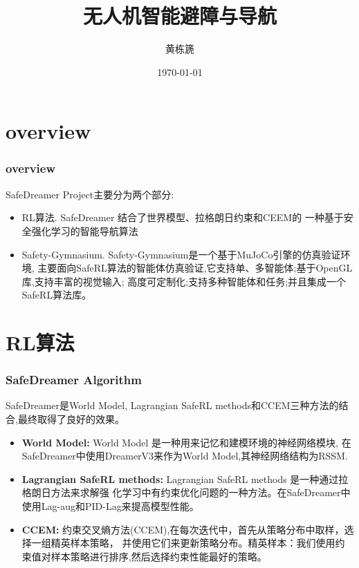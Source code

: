 \documentclass[10pt,mathserif]{beamer}%
\title{无人机智能避障与导航}
\institute[北京航空航天大学\\计算机学院]{北京航空航天大学计算机学院23级硕士研究
生} %
\author{黄栋篪}
\date{\today}%
\begin{document}
{\xdbg {}}%

\section{overview}

\begin{frame}[t, fragile]
	\frametitle{overview}
	\begin{spacing}{1.5}
		SafeDreamer Project主要分为两个部分:
		\begin{itemize}
			\item RL算法. SafeDreamer 结合了世界模型、拉格朗日约束和CEEM的
			一种基于安全强化学习的智能导航算法
			\item Safety-Gymnasium. Safety-Gymnasium是一个基于MuJoCo引擎的仿真验证环境,
			主要面向SafeRL算法的智能体仿真验证,它支持单、多智能体;基于OpenGL库,支持丰富的视觉输入;
			高度可定制化;支持多种智能体和任务;并且集成一个SafeRL算法库。
		\end{itemize}
	\end{spacing}
\end{frame}

\section{RL算法}
\begin{frame}[t, fragile]
	\frametitle{SafeDreamer Algorithm}
	\begin{spacing}{1.3}
		SafeDreamer是World Model, Lagrangian SafeRL methods和CCEM三种方法的结合,最终取得了良好的效果。
		\begin{itemize}
			\item \textbf{World Model:} World Model 是一种用来记忆和建模环境的神经网络模块,
			在SafeDreamer中使用DreamerV3来作为World Model,其神经网络结构为RSSM.
			\item \textbf{Lagrangian SafeRL methods:} Lagrangian SafeRL methods 是一种通过拉格朗日方法来求解强
			化学习中有约束优化问题的一种方法。在SafeDreamer中使用Lag-aug和PID-Lag来提高模型性能。
			\item \textbf{CCEM:} 约束交叉熵方法(CCEM),在每次迭代中，首先从策略分布中取样，选择一组精英样本策略，
			并使用它们来更新策略分布。精英样本：我们使用约束值对样本策略进行排序,然后选择约束性能最好的策略。
		\end{itemize}
	\end{spacing}
\end{frame}
\end{document}
